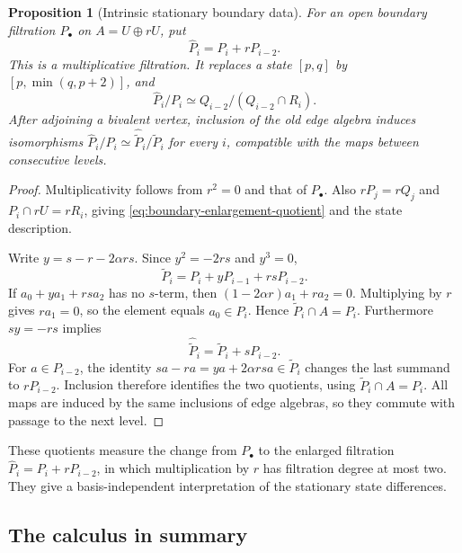 \documentclass[reqno]{article}
\theoremstyle{plain} %
\newtheorem{proposition}[theorem]{Proposition}
\theoremstyle{definition}
\theoremstyle{remark}
\numberwithin{equation}{section}
\begin{document}
\begin{proposition}[Intrinsic stationary boundary data]
\label{prop:boundary-enlargement}
For an open boundary filtration $P_\bullet$ on $A=U\oplus rU$, put
\begin{equation}\label{eq:boundary-enlargement}
\widehat P_i=P_i+rP_{i-2}.
\end{equation}
This is a multiplicative filtration. It replaces a state $[p,q]$ by
$[p,\min(q,p+2)]$, and
\begin{equation}\label{eq:boundary-enlargement-quotient}
\widehat P_i/P_i\simeq Q_{i-2}/(Q_{i-2}\cap R_i).
\end{equation}
After adjoining a bivalent vertex, inclusion of the old edge algebra
induces isomorphisms
$\widehat P_i/P_i\simeq\widehat{\widetilde P}_i/\widetilde P_i$
for every $i$, compatible with the maps between consecutive levels.
\end{proposition}
\begin{proof}
Multiplicativity follows from $r^2=0$ and that of $P_\bullet$.
Also $rP_j=rQ_j$ and $P_i\cap rU=rR_i$, giving
\eqref{eq:boundary-enlargement-quotient} and the state description.

Write $y=s-r-2\alpha rs$. Since $y^2=-2rs$ and $y^3=0$,
\[
\widetilde P_i=P_i+yP_{i-1}+rsP_{i-2}.
\]
If $a_0+ya_1+rsa_2$ has no $s$-term, then
$(1-2\alpha r)a_1+ra_2=0$. Multiplying by $r$ gives $ra_1=0$,
so the element equals $a_0\in P_i$. Hence
$\widetilde P_i\cap A=P_i$.
Furthermore $sy=-rs$ implies
\[
\widehat{\widetilde P}_i=\widetilde P_i+sP_{i-2}.
\]
For $a\in P_{i-2}$, the identity
$sa-ra=ya+2\alpha rsa\in\widetilde P_i$ changes the last summand to
$rP_{i-2}$. Inclusion therefore identifies the two quotients, using
$\widetilde P_i\cap A=P_i$. All maps are induced by the same inclusions
of edge algebras, so they commute with passage to the next level.
\end{proof}

These quotients measure the change from $P_\bullet$ to the enlarged
filtration $\widehat P_i=P_i+rP_{i-2}$, in which multiplication by $r$
has filtration degree at most two. They give a basis-independent
interpretation of the stationary state differences.

\subsection{The calculus in summary}
\label{sec:calculus}
\end{document}
